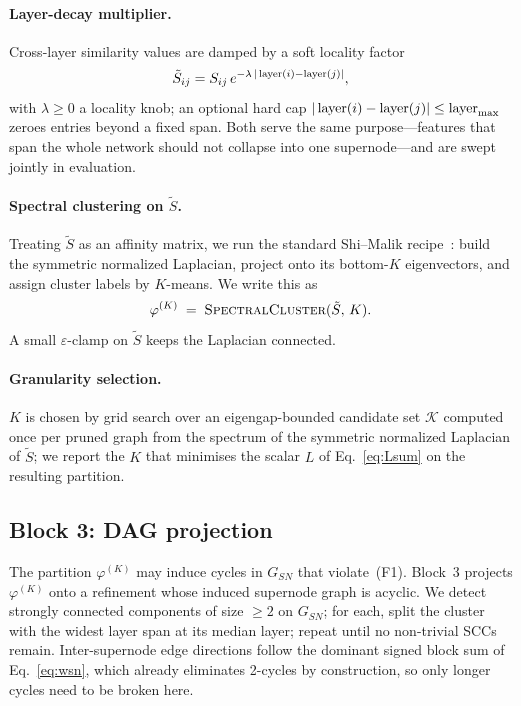 \paragraph{Layer-decay multiplier.}
Cross-layer similarity values are damped by a soft locality factor
\begin{equation}
\tilde S_{ij} = S_{ij}\,e^{-\lambda \, |\operatorname{layer}(i) - \operatorname{layer}(j)|},
\label{eq:Stilde}
\end{equation}
with $\lambda \ge 0$ a locality knob; an optional hard cap
$|\operatorname{layer}(i) - \operatorname{layer}(j)| \le \operatorname{layer}_{\max}$ zeroes entries beyond a
fixed span. Both serve the same purpose---features that span the
whole network should not collapse into one supernode---and are
swept jointly in evaluation.

\paragraph{Spectral clustering on $\tilde S$.}
Treating $\tilde S$ as an affinity matrix, we run the standard
Shi--Malik recipe~\cite{shi2000normalized, von2007tutorial}: build
the symmetric normalized Laplacian, project onto its bottom-$K$
eigenvectors, and assign cluster labels by $K$-means. We write this
as
\begin{equation}
\varphi^{(K)} \;=\; \textsc{SpectralCluster}(\tilde S,\, K).
\label{eq:spec}
\end{equation}
A small $\varepsilon$-clamp on $\tilde S$ keeps the Laplacian
connected.

\paragraph{Granularity selection.}
$K$ is chosen by grid search over an eigengap-bounded candidate set
$\mathcal{K}$ computed once per pruned graph from the spectrum of
the symmetric normalized Laplacian of $\tilde S$; we report the $K$
that minimises the scalar $L$ of Eq.~\eqref{eq:Lsum} on the
resulting partition.

\subsection{Block 3: DAG projection}\label{sec:solution-dag}
The partition $\varphi^{(K)}$ may induce cycles in $G_{SN}$ that
violate~(F1). Block~3 projects $\varphi^{(K)}$ onto a refinement
whose induced supernode graph is acyclic. We detect strongly
connected components of size $\ge 2$ on $G_{SN}$; for each, split
the cluster with the widest layer span at its median layer; repeat
until no non-trivial SCCs remain. Inter-supernode edge directions
follow the dominant signed block sum of Eq.~\eqref{eq:wsn}, which
already eliminates 2-cycles by construction, so only longer cycles
need to be broken here.

